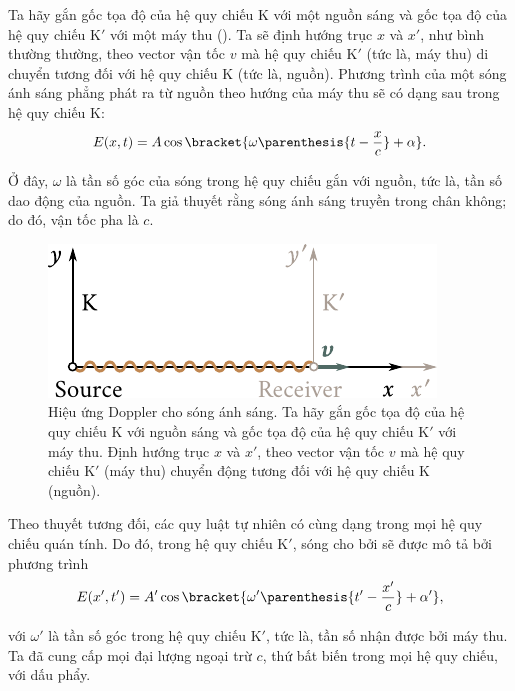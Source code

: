 Ta hãy gắn gốc tọa độ của hệ quy chiếu K với một nguồn sáng và gốc tọa độ của hệ quy chiếu K$'$ với một máy thu ().
Ta sẽ định hướng trục $x$ và $x'$, như bình thường thường, theo vector vận tốc $v$ mà hệ quy chiếu K$'$ (tức là, máy thu) di chuyển tương đối với hệ quy chiếu K (tức là, nguồn).
Phương trình của một sóng ánh sáng phẳng phát ra từ nguồn theo hướng của máy thu sẽ có dạng sau trong hệ quy chiếu K:
\begin{equation}\label{eq:21_9}
	E(x,t) = A \cos\bracket{\omega \parenthesis{t - \frac{x}{c}} + \alpha}.
\end{equation}

\noindent
Ở đây, $\omega$ là tần số góc của sóng trong hệ quy chiếu gắn với nguồn, tức là, tần số dao động của nguồn.
Ta giả thuyết rằng sóng ánh sáng truyền trong chân không; do đó, vận tốc pha là $c$.

\begin{figure}[!htb]
	\begin{center}
		\includegraphics[scale=1]{figures/ch_21/fig_21_8.pdf}
        \caption[]{Hiệu ứng Doppler cho sóng ánh sáng. Ta hãy gắn gốc tọa độ của hệ quy chiếu K với nguồn sáng và gốc tọa độ của hệ quy chiếu K$'$ với máy thu. Định hướng trục $x$ và $x'$, theo vector vận tốc $v$ mà hệ quy chiếu K$'$ (máy thu) chuyển động tương đối với hệ quy chiếu K (nguồn).}
		\label{fig:21_8}
	\end{center}
	\vspace{-0.8cm}
\end{figure}

Theo thuyết tương đối, các quy luật tự nhiên có cùng dạng trong mọi hệ quy chiếu quán tính.
Do đó, trong hệ quy chiếu K$'$, sóng cho bởi  sẽ được mô tả bởi phương trình
\begin{equation}\label{eq:21_10}
	E(x',t') = A' \cos\bracket{\omega' \parenthesis{t' - \frac{x'}{c}} + \alpha'},
\end{equation}

\noindent
với $\omega'$ là tần số góc trong hệ quy chiếu K$'$, tức là, tần số nhận được bởi máy thu.
Ta đã cung cấp mọi đại lượng ngoại trừ $c$, thứ bất biến trong mọi hệ quy chiếu, với dấu phẩy.

